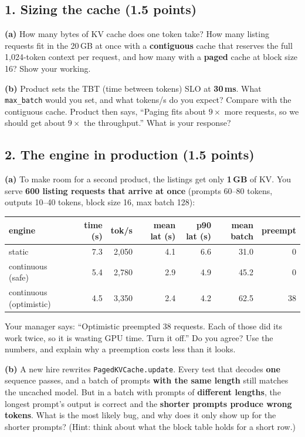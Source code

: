 \documentclass[10pt]{article}
\newcommand{\answerbox}[1]{%
  \begin{tcolorbox}[colback=white, colframe=black!40, boxrule=0.4pt,
                    arc=0pt, height=#1]\end{tcolorbox}}
\begin{document}
\subsection*{1. Sizing the cache (1.5 points)}

\textbf{(a)} How many bytes of KV cache does one token take? How many
listing requests fit in the 20\,GB at once with a \textbf{contiguous}
cache that reserves the full 1{,}024-token context per request, and how
many with a \textbf{paged} cache at block size 16? Show your working.
\answerbox{4.2cm}

\textbf{(b)} Product sets the TBT (time between tokens) SLO at
\textbf{30\,ms}. What \texttt{max\_batch} would you set, and what
tokens/s do you expect? Compare with the contiguous cache. Product then
says, ``Paging fits about $9\times$ more requests, so we should get about
$9\times$ the throughput.'' What is your response?
\answerbox{4.2cm}

\newpage
\subsection*{2. The engine in production (1.5 points)}

\textbf{(a)} To make room for a second product, the listings get only
\textbf{1\,GB} of KV. You serve \textbf{600 listing requests that arrive
at once} (prompts 60--80 tokens, outputs 10--40 tokens, block size 16,
max batch 128):

\begin{center}
\begin{tabular}{lrrrrrr}
\toprule
engine & time (s) & tok/s & mean lat (s) & p90 lat (s) & mean batch & preempt \\
\midrule
static                  & 7.3 & 2{,}050 & 4.1 & 6.6 & 31.0 & 0 \\
continuous (safe)       & 5.4 & 2{,}780 & 2.9 & 4.9 & 45.2 & 0 \\
continuous (optimistic) & 4.5 & 3{,}350 & 2.4 & 4.2 & 62.5 & 38 \\
\bottomrule
\end{tabular}
\end{center}

Your manager says: ``Optimistic preempted 38 requests. Each of those did
its work twice, so it is wasting GPU time. Turn it off.'' Do you agree?
Use the numbers, and explain why a preemption costs less than it looks.
\answerbox{5.5cm}

\textbf{(b)} A new hire rewrites \texttt{PagedKVCache.update}. Every test
that decodes \textbf{one} sequence passes, and a batch of prompts
\textbf{with the same length} still matches the uncached model. But in a
batch with prompts of \textbf{different lengths}, the longest prompt's
output is correct and the \textbf{shorter prompts produce wrong tokens}.
What is the most likely bug, and why does it only show up for the shorter
prompts? (Hint: think about what the block table holds for a short row.)
\answerbox{5.5cm}
\end{document}
